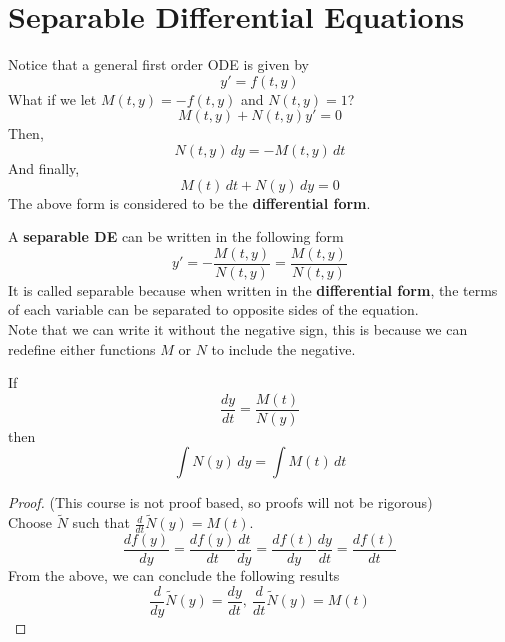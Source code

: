\documentclass[diffeq.tex]{subfiles}
\begin{document}
    \section{Separable Differential Equations}
    Notice that a general first order ODE is given by
    \begin{equation}
        y' = f(t, y)
    \end{equation}
    What if we let $M(t, y) = -f(t, y)$ and $N(t, y) = 1$?
    \begin{equation}
        M(t, y) + N(t, y)y' = 0
    \end{equation}
    Then,
    \begin{equation}
        N(t, y)\,dy = -M(t, y)\,dt
    \end{equation}
    And finally,
    \begin{equation}
        M(t)\,dt + N(y)\,dy = 0
    \end{equation}
    The above form is considered to be the \textbf{differential form}.
    \begin{definition}[Separable DE]
        A \textbf{separable DE} can be written in the following form
        \begin{equation}
            y' = -\frac{M(t, y)}{N(t, y)} = \frac{M(t, y)}{N(t, y)}
        \end{equation}
        It is called separable because when written in the \textbf{differential form}, the terms of each variable can be separated to opposite sides of the equation.\\
        Note that we can write it without the negative sign, this is because we can redefine either functions $M$ or $N$ to include the negative.
    \end{definition}
    \np
    \begin{theorem}
        If
        \begin{equation}
            \frac{dy}{dt} = \frac{M(t)}{N(y)}
        \end{equation}
        then
        \begin{equation}
            \int N(y)\,dy=\int M(t)\,dt
        \end{equation}
    \end{theorem}
    \begin{proof}
        (This course is not proof based, so proofs will not be rigorous)\\
        Choose $\widetilde{N}$ such that $\frac{d}{dt}\widetilde{N}(y) = M(t)$.
        \begin{equation}
            \frac{df(y)}{dy} = \frac{df(y)}{dt}\frac{dt}{dy} = \frac{df(t)}{dy}\frac{dy}{dt} = \frac{df(t)}{dt}
        \end{equation}
        From the above, we can conclude the following results
        \begin{equation}
            \frac{d}{dy}\widetilde{N}(y) = \frac{dy}{dt},\ \frac{d}{dt}\widetilde{N}(y) = M(t)
        \end{equation}
    \end{proof}
\end{document}
